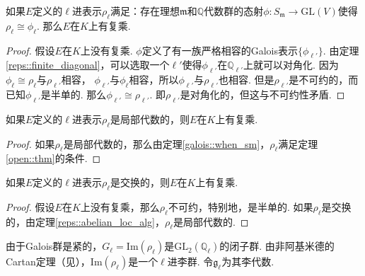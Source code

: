\begin{cthm}
    如果$E$定义的$\ell$进表示$\rho_{\ell}$满足：存在理想$\mathfrak{m}$和$\mathbb{Q}$代数群的态射$\phi: S_{\mathfrak{m}}\to \mathrm{GL}(V)$使得$\rho_{\ell} \cong \phi_{\ell}$. 那么$E$在$K$上有复乘.\label{open::thm}
\end{cthm}

\begin{proof}
    假设$E$在$K$上没有复乘.
    $\phi$定义了有一族严格相容的Galois表示$\{\phi_{\ell'}\}$.
    由定理\ref{reps::finite_diagonal}，可以选取一个$\ell'$使得$\phi_{\ell'}$在$\mathbb{Q}_{\ell'}$上就可以对角化. 
    因为$\phi_{\ell}\cong\rho_{\ell}$与$\rho_{\ell'}$相容，
    $\phi_{\ell'}$与$\phi_{\ell}$相容，所以$\phi_{\ell'}$与$\rho_{\ell'}$也相容.
    但是$\rho_{\ell'}$是不可约的，而已知$\phi_{\ell'}$是半单的. 那么$\phi_{\ell'}\cong \rho_{\ell'}$.
    即$\rho_{\ell'}$是对角化的，但这与不可约性矛盾.
\end{proof}

\begin{ccor}
    如果$E$定义的$\ell$进表示$\rho_{\ell}$是局部代数的，则$E$在$K$上有复乘. \label{reps::when_cm}
\end{ccor}

\begin{proof}
    如果$\rho_{\ell}$是局部代数的，那么由定理\ref{galois::when_sm}，$\rho_{\ell}$满足定理\ref{open::thm}的条件.
\end{proof}

\begin{ccor}
    如果$E$定义的$\ell$进表示$\rho_{\ell}$是交换的，则$E$在$K$上有复乘.
\end{ccor}

\begin{proof}
    假设$E$在$K$上没有复乘，那么$\rho_{\ell}$不可约，特别地，是半单的.
    如果$\rho_{\ell}$是交换的，由定理\ref{reps::abelian_loc_alg}，$\rho_{\ell}$是局部代数的.
\end{proof}

由于Galois群是紧的，$G_{\ell} = \mathrm{Im}(\rho_\ell)$是$\mathrm{GL}_2(\mathbb{Q}_{\ell})$的闭子群. 由非阿基米德的Cartan定理（见{\parencite[][p. 155]{serre2009lie}}），$\mathrm{Im}(\rho_{\ell})$是一个$\ell$进李群. 令$\mathfrak{g}_{\ell}$为其李代数.

